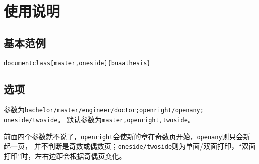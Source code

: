 \chapter{使用说明}
	\section{基本范例}
	\texttt{documentclass[master,oneside]\{buaathesis\}}
	\newpage
	\section{选项}
参数为\texttt{bachelor/master/engineer/doctor;openright/openany; oneside/twoside}。
默认参数为\texttt{master,openright,twoside}。\par
前面四个参数就不说了，\texttt{openright}会使新的章在奇数页开始，\texttt{openany}则只会新起一页，
并不判断是奇数或偶数页；\texttt{oneside/twoside}则为单面/双面打印，“双面打印”时，左右边距会根据奇偶页变化。\par